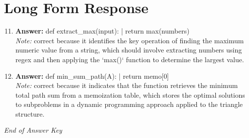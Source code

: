 \documentclass[12pt]{article}
\begin{document}
\section*{Long Form Response}
\begin{enumerate}[label=\arabic*.]
\setcounter{enumi}{10}
\item \textbf{Answer:} def extract\_max(input): | return max(numbers)
\\ \textit{Note:} correct because it identifies the key operation of finding the maximum numeric value from a string, which should involve extracting numbers using regex and then applying the `max()` function to determine the largest value.
\item \textbf{Answer:} def min\_sum\_path(A): | return memo[0]
\\ \textit{Note:} correct because it indicates that the function retrieves the minimum total path sum from a memoization table, which stores the optimal solutions to subproblems in a dynamic programming approach applied to the triangle structure.
\end{enumerate}

\vfill
\noindent\textit{End of Answer Key}
\end{document}
